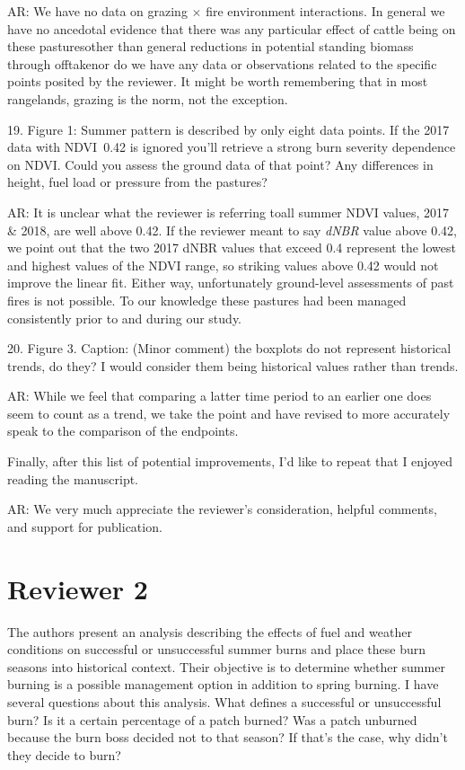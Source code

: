 \documentclass[parskip=half, american]{scrartcl}
\newcommand{\AR}[1]
	{\color{PineGreen}AR: #1\color{black} \par }
\begin{document}
\AR{We have no data on grazing $\times$ fire environment interactions. 
In general we have no ancedotal evidence that there was any particular effect of cattle being on these pastures\textemdash other than general reductions in potential standing biomass through offtake\textemdash nor do we have any data or observations related to the specific points posited by the reviewer.
It might be worth remembering that in most rangelands, grazing is the norm, not the exception.    }

19.	Figure 1: Summer pattern is described by only eight data points. If the 2017 data with NDVI~0.42 is ignored you’ll retrieve a strong burn severity dependence on NDVI. Could you assess the ground data of that point? Any differences in height, fuel load or pressure from the pastures?

\AR{ It is unclear what the reviewer is referring to\textemdash all summer NDVI values, 2017 \& 2018, are well above 0.42. 
If the reviewer meant to say \emph{dNBR} value above 0.42, we point out that the two 2017 dNBR values that exceed 0.4 represent the lowest and highest values of the NDVI range, so striking values above 0.42 would not improve the linear fit.  
Either way, unfortunately ground-level assessments of past fires is not possible. 
To our knowledge these pastures had been managed consistently prior to and during our study. }

20.	Figure 3. Caption: (Minor comment) the boxplots do not represent historical trends, do they? I would consider them being historical values rather than trends.  

\AR{While we feel that comparing a latter time period to an earlier one does seem to count as a trend, we take the point and have revised to more accurately speak to the comparison of the endpoints.    }

Finally, after this list of potential improvements, I'd like to repeat that I enjoyed reading the manuscript. 

\AR{We very much appreciate the reviewer's consideration, helpful comments, and support for publication. }

\section*{Reviewer 2}

The authors present an analysis describing the effects of fuel and weather conditions on successful or unsuccessful summer burns and place these burn seasons into historical context.  Their objective is to determine whether summer burning is a possible management option in addition to spring burning.  I have several questions about this analysis.
What defines a successful or unsuccessful burn? Is it a certain percentage of a patch burned? Was a patch unburned because the burn boss decided not to that season?  If that’s the case, why didn’t they decide to burn?  
\end{document}
